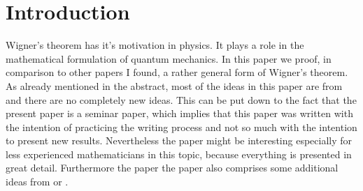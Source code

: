 \section{Introduction}

Wigner's theorem has it's motivation in physics. It plays a role in the mathematical formulation of quantum mechanics. In this paper we proof, in comparison to other papers I found, a rather general form of Wigner's theorem. As already mentioned in the abstract, most of the ideas in this paper are from \cite{spiegel2018constructive} and there are no completely new ideas. This can be put down to the fact that the present paper is a seminar paper, which implies that this paper was written with the intention of practicing the writing process and not so much with the intention to present new results. Nevertheless the paper might be interesting especially for less experienced mathematicians in this topic, because everything is presented in great detail. Furthermore the paper the paper also comprises some additional ideas from \cite{Geh_r_2014} or \cite{Bargmann_1964}. 




